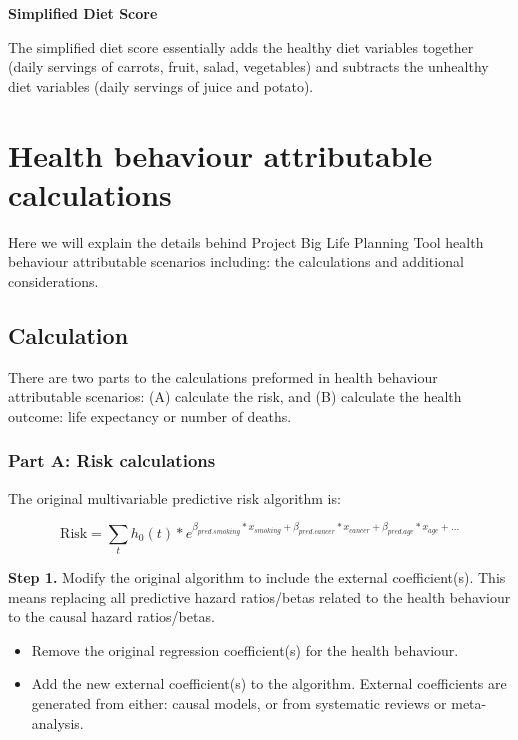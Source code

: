 \documentclass[]{book}
\providecommand{\tightlist}{%
  \setlength{\itemsep}{0pt}\setlength{\parskip}{0pt}}
\begin{document}
\textbf{Simplified Diet Score}

The simplified diet score essentially adds the healthy diet variables
together (daily servings of carrots, fruit, salad, vegetables) and
subtracts the unhealthy diet variables (daily servings of juice and
potato).

\chapter{Health behaviour attributable
calculations}\label{health-behaviour-attributable-calculations}

Here we will explain the details behind Project Big Life Planning Tool
health behaviour attributable scenarios including: the calculations and
additional considerations.

\section{Calculation}\label{calculation}

There are two parts to the calculations preformed in health behaviour
attributable scenarios: (A) calculate the risk, and (B) calculate the
health outcome: life expectancy or number of deaths.

\subsection{Part A: Risk calculations}\label{part-a-risk-calculations}

The original multivariable predictive risk algorithm is:

\[ \text{Risk} = \sum_t h_0(t) * e^{\beta_{pred.smoking}*x_{smoking}+\beta_{pred.cancer}*x_{cancer} + \beta_{pred.age}*x_{age} +...}  \]

\textbf{Step 1.} Modify the original algorithm to include the external
coefficient(s). This means replacing all predictive hazard ratios/betas
related to the health behaviour to the causal hazard ratios/betas.

\begin{itemize}
\tightlist
\item
  Remove the original regression coefficient(s) for the health
  behaviour.
\item
  Add the new external coefficient(s) to the algorithm. External
  coefficients are generated from either: causal models, or from
  systematic reviews or meta-analysis.
\end{itemize}
\end{document}
